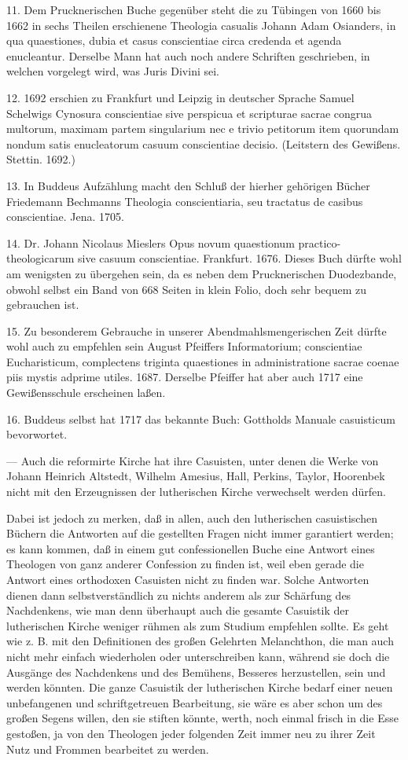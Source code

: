 11. Dem Prucknerischen Buche gegenüber steht die zu Tübingen von 1660 bis 1662 in sechs Theilen erschienene Theologia casualis Johann Adam Osianders, in qua
quaestiones, dubia et casus conscientiae circa credenda et agenda enucleantur. Derselbe Mann hat auch noch andere Schriften geschrieben, in welchen vorgelegt wird, was Juris Divini sei.

12. 1692 erschien zu Frankfurt und Leipzig in deutscher Sprache Samuel Schelwigs Cynosura conscientiae sive perspicua et scripturae sacrae congrua multorum, maximam partem singularium nec e trivio petitorum item quorundam nondum satis enucleatorum casuum conscientiae decisio. (Leitstern des Gewißens. Stettin. 1692.)

13. In Buddeus Aufzählung macht den Schluß der hierher gehörigen Bücher Friedemann Bechmanns Theologia conscientiaria, seu tractatus de casibus conscientiae. Jena. 1705.

14. Dr. Johann Nicolaus Mieslers Opus novum quaestionum practico-theologicarum sive casuum conscientiae. Frankfurt. 1676. Dieses Buch dürfte wohl am wenigsten zu übergehen sein, da es neben dem Prucknerischen Duodezbande, obwohl selbst ein Band von 668 Seiten in klein Folio, doch sehr bequem zu gebrauchen ist.

15. Zu besonderem Gebrauche in unserer Abendmahlsmengerischen Zeit dürfte wohl auch zu empfehlen sein August Pfeiffers Informatorium; conscientiae Eucharisticum, complectens triginta quaestiones in administratione sacrae coenae piis mystis adprime utiles. 1687. Derselbe Pfeiffer hat aber auch 1717 eine Gewißensschule erscheinen laßen.

16. Buddeus selbst hat 1717 das bekannte Buch: Gottholds Manuale casuisticum bevorwortet.

— Auch die reformirte Kirche hat ihre Casuisten, unter denen die Werke von Johann Heinrich Altstedt, Wilhelm Amesius, Hall, Perkins, Taylor, Hoorenbek nicht mit den Erzeugnissen der lutherischen Kirche verwechselt werden dürfen.

Dabei ist jedoch zu merken, daß in allen, auch den lutherischen casuistischen Büchern die Antworten auf die gestellten Fragen nicht immer garantiert werden; es kann kommen, daß in einem gut confessionellen Buche eine Antwort eines Theologen von ganz anderer Confession zu finden ist, weil eben gerade die Antwort eines orthodoxen Casuisten nicht zu finden war. Solche Antworten dienen dann selbstverständlich zu nichts anderem als zur Schärfung des Nachdenkens, wie man denn überhaupt auch die gesamte Casuistik der lutherischen Kirche weniger rühmen als zum Studium empfehlen sollte. Es geht wie z. B. mit den Definitionen des großen Gelehrten Melanchthon, die man auch nicht mehr einfach wiederholen oder unterschreiben kann, während sie doch die Ausgänge des Nachdenkens und des Bemühens, Besseres herzustellen, sein und werden könnten. Die ganze Casuistik der lutherischen Kirche bedarf einer neuen unbefangenen und schriftgetreuen Bearbeitung, sie wäre es aber schon um des großen Segens willen, den sie stiften könnte, werth, noch einmal frisch in die Esse gestoßen, ja von den Theologen jeder folgenden Zeit immer neu zu ihrer Zeit Nutz und Frommen bearbeitet zu werden.

